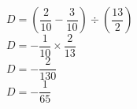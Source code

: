 \begin{corrige}
\begin{spacing}{1.5}
\begin{itemize}
                    {\red $D=\left(\dfrac{2}{10}-\dfrac{3}{10}\right)\div\left(\dfrac{13}{2}\right)$}\\
                    {\red $D=-\dfrac{1}{10}\times\dfrac{2}{13}$}\\
                    {\red $D=-\dfrac{2}{130}$}\\
                    {\red $D=-\dfrac{1}{65}$}\\
                \end{itemize}
            \end{spacing}
\end{corrige}

